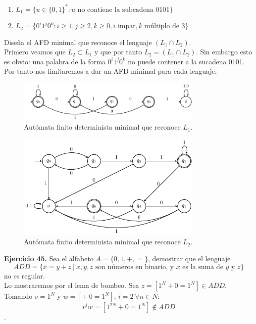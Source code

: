 \documentclass[11pt,a4paper]{article}
\begin{document}
\begin{enumerate}
\item $L_1 = \{ u \in \{0,1\}^* : u \text{ no contiene la subcadena } 0101 \}$
\item $L_2 = \{ 0^i1^j0^k : i \geq 1, j \geq 2, k \geq 0, i \text{ impar}, k \text{ múltiplo de } 3  \}$
\end{enumerate}
Diseña el AFD minimal que reconoce el lenguaje $(L_1 \cap L_2)$. \\

Primero veamos que $L_2 \subset L_1$ y que por tanto $L_2 = (L_1 \cap L_2)$. Sin embargo esto es obvio: una palabra de la forma $0^i1^j0^k$ no puede contener a la sucadena 0101. Por tanto nos limitaremos a dar un AFD minimal para cada lenguaje.

\begin{figure}[H]
	\centering
	\includegraphics[width=0.8\textwidth]{afd_29_1}
	\caption{Autómata finito determinista minimal que reconoce $L_1$.}
\end{figure}

\begin{figure}[H]
	\centering
	\includegraphics[width=0.8\textwidth]{afd_29_2}
	\caption{Autómata finito determinista minimal que reconoce $L_2$.}
\end{figure}

\textbf{Ejercicio 45.} Sea el alfabeto $A = \{0, 1, +, =\}$, demostrar que el lenguaje
$$ADD = \{x = y + z \ |\  x, y, z \text{ son números en binario, y } x  \text { es la suma de } y \text{ y } z\}$$
no es regular. \\

Lo mostraremos por el lema de bombeo. Sea $z = [1^N + 0 = 1^N] \in ADD$. Tomando $v = 1^N$ y $w = [+\ 0 = 1^N]$, $i=2\ \forall n \in N$:
$$v^iw = [1^{2N} + 0 = 1^N] \notin ADD$$.
\end{document}
